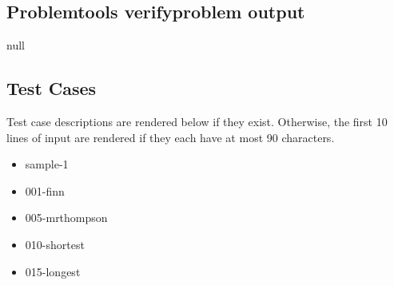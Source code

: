 \documentclass{article}%
\begin{document}
\subsection{Problemtools verifyproblem output}%
\label{subsec:Problemtoolsverifyproblemoutput}%
null

%
\subsection{Test Cases}%
\label{subsec:TestCases}%
Test case descriptions are rendered below if they exist. Otherwise, the first 10 lines of input are rendered if they each have at most 90 characters.%
\begin{itemize}%
\item%
sample{-}1%
\item%
001{-}finn%
%
\item%
005{-}mrthompson%
%
\item%
010{-}shortest%
\item%
015{-}longest%
\end{itemize}

%
\end{document}
